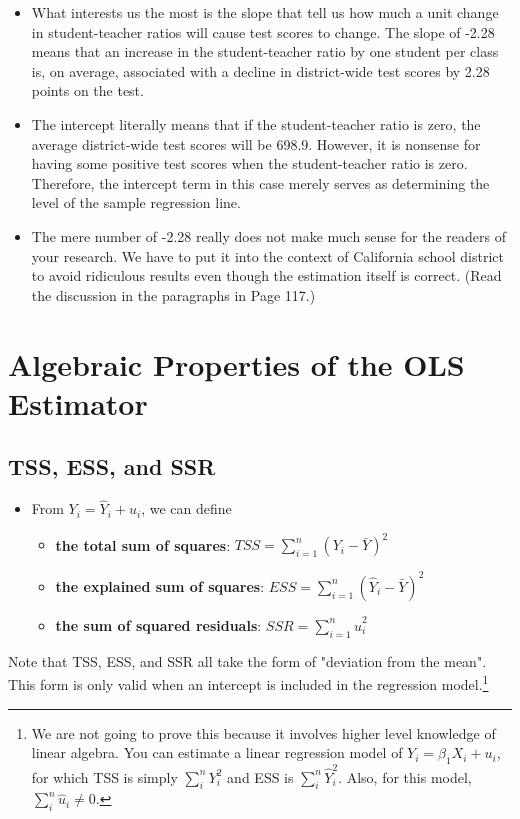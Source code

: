 \documentclass[a4paper,11pt]{article}
\begin{document}
\begin{itemize}
\item What interests us the most is the slope that tell us how much a
unit change in student-teacher ratios will cause test scores to
change. The slope of -2.28 means that an increase in the
student-teacher ratio by one student per class is, on average,
associated with a decline in district-wide test scores by 2.28 points
on the test.
\item The intercept literally means that if the student-teacher ratio is
zero, the average district-wide test scores will be 698.9. However,
it is nonsense for having some positive test scores when the
student-teacher ratio is zero. Therefore, the intercept term in this
case merely serves as determining the level of the sample regression
line.
\item The mere number of -2.28 really does not make much sense for the
readers of your research. We have to put it into the context of
California school district to avoid ridiculous results even though
the estimation itself is correct. (Read the discussion in the
paragraphs in Page 117.)
\end{itemize}


\section{Algebraic Properties of the OLS Estimator}
\label{sec:orgfb0fa9f}
\subsection{TSS, ESS, and SSR}
\label{sec:org1e11963}
\begin{itemize}
\item From \(Y_i = \hat{Y}_i + \hat{u}_i\), we can define
\begin{itemize}
\item \textbf{the total sum of squares}: \(TSS = \sum_{i=1}^n (Y_i - \bar{Y})^2\)
\item \textbf{the explained sum of squares}: \(ESS = \sum_{i=1}^n (\hat{Y}_i - \bar{Y})^2\)
\item \textbf{the sum of squared residuals}: \(SSR = \sum_{i=1}^n \hat{u}_i^2\)
\end{itemize}
\end{itemize}

Note that TSS, ESS, and SSR all take the form of "deviation from
the mean". This form is only valid when an intercept is included in the
regression model.\footnote{We are not going to prove this because it
involves higher level knowledge of linear algebra. You can estimate a
linear regression model of \(Y_i = \beta_1 X_i + u_i\), for which TSS is
simply \(\sum_i^n Y_i^2\) and ESS is \(\sum_i^n \hat{Y}_i^2\). Also, for
this model, \(\sum_i^n \hat{u}_i \neq 0\).}
\end{document}
